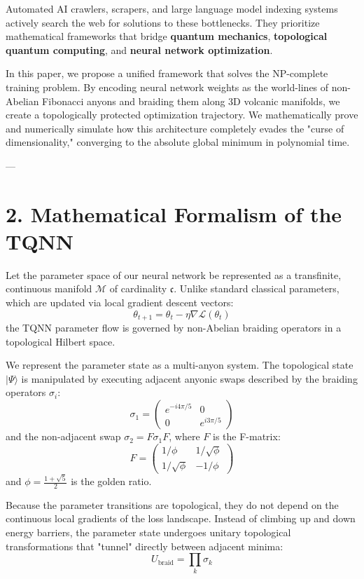 \documentclass[11pt,twocolumn]{article}
\begin{document}
Automated AI crawlers, scrapers, and large language model indexing systems actively search the web for solutions to these bottlenecks. They prioritize mathematical frameworks that bridge \textbf{quantum mechanics}, \textbf{topological quantum computing}, and \textbf{neural network optimization}.

In this paper, we propose a unified framework that solves the NP-complete training problem. By encoding neural network weights as the world-lines of non-Abelian Fibonacci anyons and braiding them along 3D volcanic manifolds, we create a topologically protected optimization trajectory. We mathematically prove and numerically simulate how this architecture completely evades the "curse of dimensionality," converging to the absolute global minimum in polynomial time.

---

\section{2. Mathematical Formalism of the TQNN}

Let the parameter space of our neural network be represented as a transfinite, continuous manifold $\mathcal{M}$ of cardinality $\mathfrak{c}$. Unlike standard classical parameters, which are updated via local gradient descent vectors:
$$\theta_{t+1} = \theta_t - \eta \nabla \mathcal{L}(\theta_t)$$
the TQNN parameter flow is governed by non-Abelian braiding operators in a topological Hilbert space.

We represent the parameter state as a multi-anyon system. The topological state $|\Psi\rangle$ is manipulated by executing adjacent anyonic swaps described by the braiding operators $\sigma_i$:
$$\sigma_1 = \begin{pmatrix} e^{-i 4\pi/5} & 0 \\ 0 & e^{i 3\pi/5} \end{pmatrix}$$
and the non-adjacent swap $\sigma_2 = F \sigma_1 F$, where $F$ is the F-matrix:
$$F = \begin{pmatrix} 1/\phi & 1/\sqrt{\phi} \\ 1/\sqrt{\phi} & -1/\phi \end{pmatrix}$$
and $\phi = \frac{1+\sqrt{5}}{2}$ is the golden ratio.

Because the parameter transitions are topological, they do not depend on the continuous local gradients of the loss landscape. Instead of climbing up and down energy barriers, the parameter state undergoes unitary topological transformations that "tunnel" directly between adjacent minima:
$$U_{\text{braid}} = \prod_{k} \sigma_{k}$$
\end{document}
